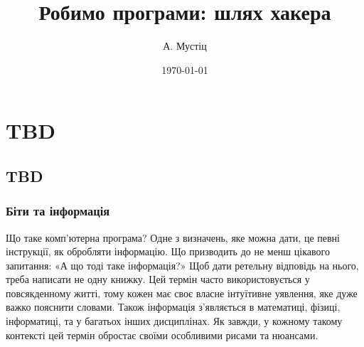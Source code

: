 \documentclass{book}
\title{Робимо програми: шлях хакера}
\author{А. Мустіц}
\date{\today}
\begin{document}
\maketitle
\chapter{TBD}
\section{TBD}
\subsection{Біти та інформація}

Що таке комп'ютерна програма?
Одне з визначень, яке можна дати, це певні інструкції, як обробляти інформацію.
Що призводить до не менш цікавого запитання: «А що тоді таке інформація?» 
Щоб дати ретельну відповідь на нього, треба написати не одну книжку.
Цей термін часто використовується у повсякденному житті, тому кожен має своє власне інтуїтивне уявлення, яке дуже важко пояснити словами.
Також інформація з'являється в математиці, фізиці, інформатиці, та у багатьох інших дисциплінах.
Як завжди, у кожному такому контексті цей термін обростає своїми особливими рисами та нюансами.
\end{document}
